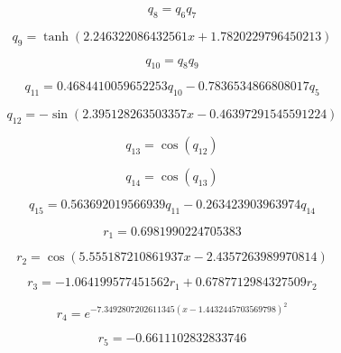 \begin{equation}
q_{8}=q_{6} q_{7}
\end{equation}


\begin{equation}
q_{9}=\tanh{\left(2.246322086432561 x + 1.7820229796450213 \right)}
\end{equation}


\begin{equation}
q_{10}=q_{8} q_{9}
\end{equation}


\begin{equation}
q_{11}=0.4684410059652253 q_{10} - 0.7836534866808017 q_{5}
\end{equation}


\begin{equation}
q_{12}=- \sin{\left(2.395128263503357 x - 0.46397291545591224 \right)}
\end{equation}


\begin{equation}
q_{13}=\cos{\left(q_{12} \right)}
\end{equation}


\begin{equation}
q_{14}=\cos{\left(q_{13} \right)}
\end{equation}


\begin{equation}
q_{15}=0.563692019566939 q_{11} - 0.263423903963974 q_{14}
\end{equation}


\begin{equation}
r_{1}=0.6981990224705383
\end{equation}


\begin{equation}
r_{2}=\cos{\left(5.555187210861937 x - 2.4357263989970814 \right)}
\end{equation}


\begin{equation}
r_{3}=- 1.064199577451562 r_{1} + 0.6787712984327509 r_{2}
\end{equation}


\begin{equation}
r_{4}=e^{- 7.3492807202611345 \left(x - 1.4432445703569798\right)^{2}}
\end{equation}


\begin{equation}
r_{5}=-0.6611102832833746
\end{equation}


